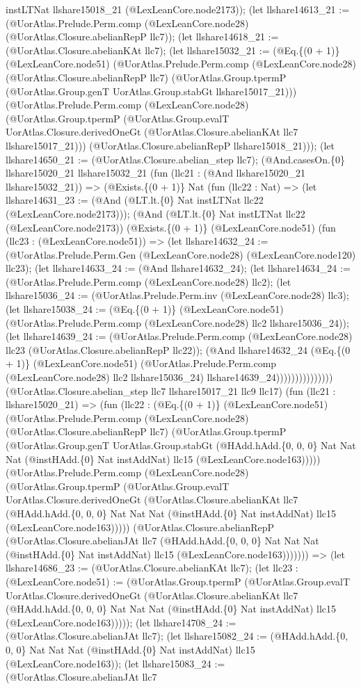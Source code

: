 \documentclass[11pt]{article}
\begin{document}
instLTNat llshare15018\_21 (@LexLeanCore.node2173)); (let llshare14613\_21 := (@UorAtlas.Prelude.Perm.comp (@LexLeanCore.node28) (@UorAtlas.Closure.abelianRepP llc7)); (let llshare14618\_21 := (@UorAtlas.Closure.abelianKAt llc7); (let llshare15032\_21 := (@Eq.\{(0 + 1)\} (@LexLeanCore.node51) (@UorAtlas.Prelude.Perm.comp (@LexLeanCore.node28) (@UorAtlas.Closure.abelianRepP llc7) (@UorAtlas.Group.tpermP (@UorAtlas.Group.genT UorAtlas.Group.stabGt llshare15017\_21))) (@UorAtlas.Prelude.Perm.comp (@LexLeanCore.node28) (@UorAtlas.Group.tpermP (@UorAtlas.Group.evalT UorAtlas.Closure.derivedOneGt (@UorAtlas.Closure.abelianKAt llc7 llshare15017\_21))) (@UorAtlas.Closure.abelianRepP llshare15018\_21))); (let llshare14650\_21 := (@UorAtlas.Closure.abelian\_step llc7); (@And.casesOn.\{0\} llshare15020\_21 llshare15032\_21 (fun (llc21 : (@And llshare15020\_21 llshare15032\_21)) => (@Exists.\{(0 + 1)\} Nat (fun (llc22 : Nat) => (let llshare14631\_23 := (@And (@LT.lt.\{0\} Nat instLTNat llc22 (@LexLeanCore.node2173))); (@And (@LT.lt.\{0\} Nat instLTNat llc22 (@LexLeanCore.node2173)) (@Exists.\{(0 + 1)\} (@LexLeanCore.node51) (fun (llc23 : (@LexLeanCore.node51)) => (let llshare14632\_24 := (@UorAtlas.Prelude.Perm.Gen (@LexLeanCore.node28) (@LexLeanCore.node120) llc23); (let llshare14633\_24 := (@And llshare14632\_24); (let llshare14634\_24 := (@UorAtlas.Prelude.Perm.comp (@LexLeanCore.node28) llc2); (let llshare15036\_24 := (@UorAtlas.Prelude.Perm.inv (@LexLeanCore.node28) llc3); (let llshare15038\_24 := (@Eq.\{(0 + 1)\} (@LexLeanCore.node51) (@UorAtlas.Prelude.Perm.comp (@LexLeanCore.node28) llc2 llshare15036\_24)); (let llshare14639\_24 := (@UorAtlas.Prelude.Perm.comp (@LexLeanCore.node28) llc23 (@UorAtlas.Closure.abelianRepP llc22)); (@And llshare14632\_24 (@Eq.\{(0 + 1)\} (@LexLeanCore.node51) (@UorAtlas.Prelude.Perm.comp (@LexLeanCore.node28) llc2 llshare15036\_24) llshare14639\_24))))))))))))))) (@UorAtlas.Closure.abelian\_step llc7 llshare15017\_21 llc9 llc17) (fun (llc21 : llshare15020\_21) => (fun (llc22 : (@Eq.\{(0 + 1)\} (@LexLeanCore.node51) (@UorAtlas.Prelude.Perm.comp (@LexLeanCore.node28) (@UorAtlas.Closure.abelianRepP llc7) (@UorAtlas.Group.tpermP (@UorAtlas.Group.genT UorAtlas.Group.stabGt (@HAdd.hAdd.\{0, 0, 0\} Nat Nat Nat (@instHAdd.\{0\} Nat instAddNat) llc15 (@LexLeanCore.node163))))) (@UorAtlas.Prelude.Perm.comp (@LexLeanCore.node28) (@UorAtlas.Group.tpermP (@UorAtlas.Group.evalT UorAtlas.Closure.derivedOneGt (@UorAtlas.Closure.abelianKAt llc7 (@HAdd.hAdd.\{0, 0, 0\} Nat Nat Nat (@instHAdd.\{0\} Nat instAddNat) llc15 (@LexLeanCore.node163))))) (@UorAtlas.Closure.abelianRepP (@UorAtlas.Closure.abelianJAt llc7 (@HAdd.hAdd.\{0, 0, 0\} Nat Nat Nat (@instHAdd.\{0\} Nat instAddNat) llc15 (@LexLeanCore.node163))))))) => (let llshare14686\_23 := (@UorAtlas.Closure.abelianKAt llc7); (let llc23 : (@LexLeanCore.node51) := (@UorAtlas.Group.tpermP (@UorAtlas.Group.evalT UorAtlas.Closure.derivedOneGt (@UorAtlas.Closure.abelianKAt llc7 (@HAdd.hAdd.\{0, 0, 0\} Nat Nat Nat (@instHAdd.\{0\} Nat instAddNat) llc15 (@LexLeanCore.node163))))); (let llshare14708\_24 := (@UorAtlas.Closure.abelianJAt llc7); (let llshare15082\_24 := (@HAdd.hAdd.\{0, 0, 0\} Nat Nat Nat (@instHAdd.\{0\} Nat instAddNat) llc15 (@LexLeanCore.node163)); (let llshare15083\_24 := (@UorAtlas.Closure.abelianJAt llc7 
\end{document}
